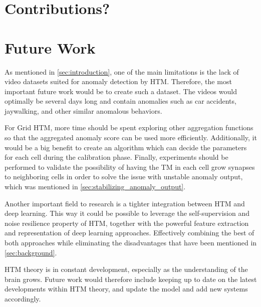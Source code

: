 \section{Contributions?}
\section{Future Work}
As mentioned in \autoref{sec:introduction}, one of the main limitations is the lack of video datasets suited for anomaly detection by HTM. Therefore, the most important future work would be to create such a dataset. The videos would optimally be several days long and contain anomalies such as car accidents, jaywalking, and other similar anomalous behaviors.
\par
For Grid HTM, more time should be spent exploring other aggregation functions so that the aggregated anomaly score can be used more efficiently.  Additionally, it would be a big benefit to create an algorithm which can decide the parameters for each cell during the calibration phase. Finally, experiments should be performed to validate the possibility of having the TM in each cell grow synapses to neighboring cells in order to solve the issue with unstable anomaly output, which was mentioned in \autoref{sec:stabilizing_anomaly_output}.
\par
Another important field to research is a tighter integration between HTM and deep learning. This way it could be possible to leverage the self-supervision and noise resilience property of HTM, together with the powerful feature extraction and representation of deep learning approaches. Effectively combining the best of both approaches while eliminating the disadvantages that have been mentioned in \autoref{sec:background}.
\par
HTM theory is in constant development, especially as the understanding of the brain grows. Future work would therefore include keeping up to date on the latest developments within HTM theory, and update the model and add new systems accordingly.